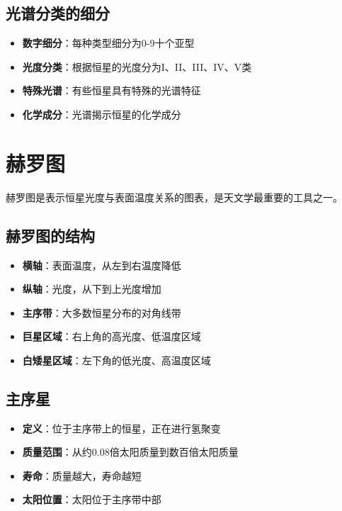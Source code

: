 \documentclass[12pt,UTF8]{ctexbook}
\begin{document}
\subsection{光谱分类的细分}

\begin{itemize}
  \item \textbf{数字细分}：每种类型细分为0-9十个亚型
  \item \textbf{光度分类}：根据恒星的光度分为I、II、III、IV、V类
  \item \textbf{特殊光谱}：有些恒星具有特殊的光谱特征
  \item \textbf{化学成分}：光谱揭示恒星的化学成分
\end{itemize}

\section{赫罗图}

赫罗图是表示恒星光度与表面温度关系的图表，是天文学最重要的工具之一。

\subsection{赫罗图的结构}

\begin{itemize}
  \item \textbf{横轴}：表面温度，从左到右温度降低
  \item \textbf{纵轴}：光度，从下到上光度增加
  \item \textbf{主序带}：大多数恒星分布的对角线带
  \item \textbf{巨星区域}：右上角的高光度、低温度区域
  \item \textbf{白矮星区域}：左下角的低光度、高温度区域
\end{itemize}

\subsection{主序星}

\begin{itemize}
  \item \textbf{定义}：位于主序带上的恒星，正在进行氢聚变
  \item \textbf{质量范围}：从约0.08倍太阳质量到数百倍太阳质量
  \item \textbf{寿命}：质量越大，寿命越短
  \item \textbf{太阳位置}：太阳位于主序带中部
\end{itemize}
\end{document}
